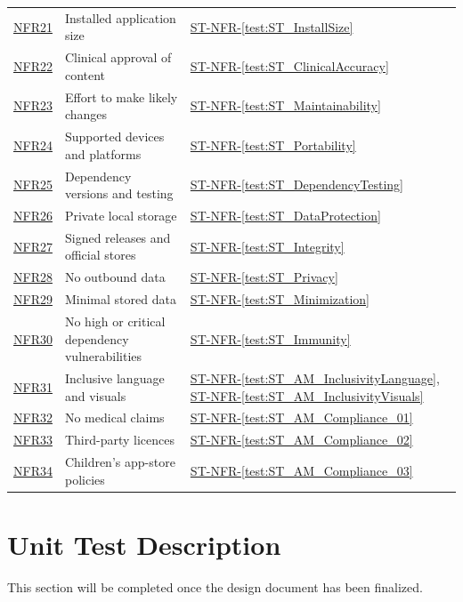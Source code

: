 \documentclass[10pt,titlepage]{article}
\newcommand{\testref}[1]{\hyperref[test:#1]{ST-NFR-\ref*{test:#1}}}
\newcommand{\srsurl}{https://team-hindsight.github.io/ophthamology-game/SRS/SRS.pdf}
\newcommand{\srsnfrref}[2]{\href{\srsurl\#nameddest=#1}{NFR#2}}
\begin{document}
\begin{longtable}{@{}>{\raggedright\arraybackslash}p{}
  >{\raggedright\arraybackslash}p{}
  >{\raggedright\arraybackslash}p{}@{}}
\srsnfrref{NFR_InstallSize}{21} & Installed application size & \testref{ST_InstallSize}\\
\srsnfrref{NFR_ClinicalAccuracy}{22} & Clinical approval of content & \testref{ST_ClinicalAccuracy}\\
\srsnfrref{NFR_Maintainability}{23} & Effort to make likely changes & \testref{ST_Maintainability}\\
\srsnfrref{NFR_Portability}{24} & Supported devices and platforms & \testref{ST_Portability}\\
\srsnfrref{NFR_DependencyTesting}{25} & Dependency versions and testing & \testref{ST_DependencyTesting}\\
\srsnfrref{NFR_DataProtection}{26} & Private local storage & \testref{ST_DataProtection}\\
\srsnfrref{NFR_Integrity}{27} & Signed releases and official stores & \testref{ST_Integrity}\\
\srsnfrref{NFR_Privacy}{28} & No outbound data & \testref{ST_Privacy}\\
\srsnfrref{NFR_Minimization}{29} & Minimal stored data & \testref{ST_Minimization}\\
\srsnfrref{NFR_Immunity}{30} & No high or critical dependency vulnerabilities & \testref{ST_Immunity}\\
\srsnfrref{NFR_Inclusivity}{31} & Inclusive language and visuals &
  \testref{ST_AM_InclusivityLanguage}, \testref{ST_AM_InclusivityVisuals}\\
\srsnfrref{NFR_NoClaims}{32} & No medical claims & \testref{ST_AM_Compliance_01}\\
\srsnfrref{NFR_Licensing}{33} & Third-party licences & \testref{ST_AM_Compliance_02}\\
\srsnfrref{NFR_StoreCompliance}{34} & Children's app-store policies & \testref{ST_AM_Compliance_03}\\
\end{longtable}

\newpage
\section{Unit Test Description}

This section will be completed once the design document has been finalized.


\end{document}
